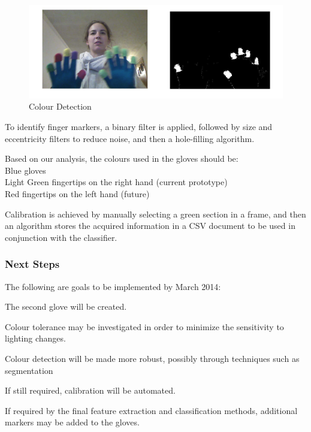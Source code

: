 \documentclass[12pt]{article}
\begin{document}
\begin{figure}[h]
  \centering
  \includegraphics[scale=1]{BinaryTest.png}
  \caption{Colour Detection}
  \label{fig:salience}
\end{figure}

To identify finger markers, a binary filter is applied, followed by size and eccentricity filters to reduce noise, and then a hole-filling algorithm.

Based on our analysis, the colours used in the gloves should be: \\
\hspace*{1cm} Blue gloves \\
\hspace*{1cm} Light Green fingertips on the right hand (current prototype) \\
\hspace*{1cm} Red fingertips on the left hand (future)


Calibration is achieved by manually selecting a green section in a frame, and then an algorithm stores the acquired information in a CSV document to be used in conjunction with the classifier.

\subsubsection{Next Steps}
The following are goals to be implemented by March 2014:
\begin{enumerate*}
	\item The second glove will be created.
	\item Colour tolerance may be investigated in order to minimize the sensitivity to lighting changes.
	\item Colour detection will be made more robust, possibly through techniques such as segmentation
	\item If still required, calibration will be automated. 
	\item If required by the final feature extraction and classification methods, additional markers may be added to the gloves.
\end{enumerate*}
\end{document}

